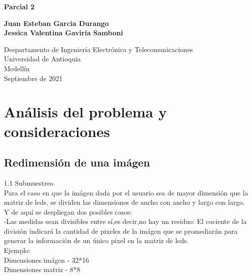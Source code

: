 \documentclass{article}
\begin{document}
\begin{titlepage}
    \begin{center}
        \vspace*{1cm}
            
        \Huge
        \textbf{Parcial 2}
            
        \vspace{0.5cm}
        \LARGE
        
            
        \vspace{1.5cm}
            
        \textbf{Juan Esteban Garcia Durango\\
            Jessica Valentina Gaviria Samboni }
        \vfill
            
        \vspace{0.8cm}
            
        \Large
        Despartamento de Ingeniería Electrónica y Telecomunicaciones\\
        Universidad de Antioquia\\
        Medellín\\
        Septiembre de 2021
            
    \end{center}
\end{titlepage}

\tableofcontents
\newpage
\section{Análisis del problema y consideraciones}\label{intro}
\subsection{Redimensión de una imágen}

  1.1 Submuestreo\\
  Para el caso en que la imágen dada por el usuario sea de mayor dimensión que la matriz de leds, se dividen las dimensiones de ancho con ancho y largo con largo. Y de aquí se despliegan dos posibles casos:\\
  
  -Las medidas sean divisibles entre sí,es decir,no hay un residuo: El cociente de la división indicará la cantidad de pixeles de la imágen que se promediarán para generar la información de un único pixel en la matriz de leds.\\
  Ejemplo:\\
  Dimensiones imágen - 32*16\\
  Dimensiones matriz - 8*8\\
  
\end{document}

